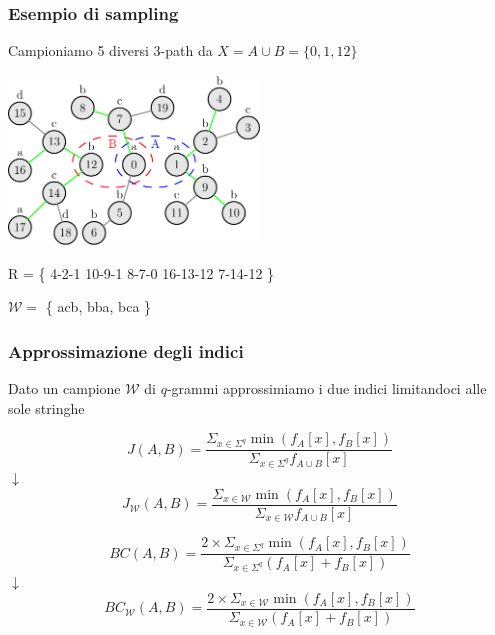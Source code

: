 \begin{frame}
	\frametitle{Esempio di sampling}
	\centering
	
	Campioniamo 5 diversi $3$-path da $X = A \cup B = \{ 0, 1, 12 \}$
	
	\includegraphics[width=0.5\textwidth]{images/13_sampl}
	
	\medskip
	
	R = \{ \color{green} 4-2-1 \color{darkgreen} 10-9-1  \color{green} 8-7-0 \color{darkgreen} 16-13-12  \color{green} 7-14-12 \color{black}\}
	
	$\mathcal{W} = $ \{ acb, bba, bca \}
	
	
\end{frame}

\begin{frame}
\frametitle{Approssimazione degli indici}
\centering

Dato un campione $\mathcal{W}$ di $q$-grammi approssimiamo i due indici limitandoci alle sole stringhe 

\begin{equation*}\label{jaccard-sub}	
J(A,B) = \frac{ \Sigma_{x \in \Sigma^{q}} \min(f_{A}[x], f_{B}[x]) }{ \Sigma_{x \in \Sigma^{q}} f_{A \cup B}[x] }
\end{equation*}
$\downarrow$
\begin{equation*}\label{jaccard-sub}	
J_{\mathcal{W}}(A,B) = \frac{ \Sigma_{x \in \mathcal{W}} \min(f_{A}[x], f_{B}[x]) }{ \Sigma_{x \in \mathcal{W}} f_{A \cup B}[x] }
\end{equation*}

\begin{equation*}\label{bray-sub}
BC(A,B) = \frac{ 2 \times \Sigma_{x \in \Sigma^{q}} \min(f_{A}[x], f_{B}[x]) }{ \Sigma_{x \in \Sigma^{q}} (f_{A}[x] + f_{B}[x]) }
\end{equation*}
$\downarrow$
\begin{equation*}\label{bray-sub}
BC_{\mathcal{W}}(A,B) = \frac{ 2 \times \Sigma_{x \in \mathcal{W}} \min(f_{A}[x], f_{B}[x]) }{ \Sigma_{x \in \mathcal{W}} (f_{A}[x] + f_{B}[x]) }
\end{equation*}

\end{frame}

